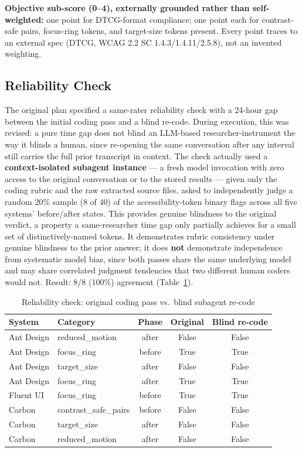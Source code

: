 \documentclass[11pt]{article}
\begin{document}
\textbf{Objective sub-score (0--4), externally grounded rather than self-weighted:} one point for DTCG-format compliance; one point each for contrast-safe pairs, focus-ring tokens, and target-size tokens present. Every point traces to an external spec (DTCG, WCAG 2.2 SC 1.4.3/1.4.11/2.5.8), not an invented weighting.

\subsection{Reliability Check}

The original plan specified a same-rater reliability check with a 24-hour gap between the initial coding pass and a blind re-code. During execution, this was revised: a pure time gap does not blind an LLM-based researcher-instrument the way it blinds a human, since re-opening the same conversation after any interval still carries the full prior transcript in context. The check actually used a \textbf{context-isolated subagent instance} --- a fresh model invocation with zero access to the original conversation or to the stored results --- given only the coding rubric and the raw extracted source files, asked to independently judge a random 20\% sample (8 of 40) of the accessibility-token binary flags across all five systems' before/after states. This provides genuine blindness to the original verdict, a property a same-researcher time gap only partially achieves for a small set of distinctively-named tokens. It demonstrates rubric consistency under genuine blindness to the prior answer; it does \textbf{not} demonstrate independence from systematic model bias, since both passes share the same underlying model and may share correlated judgment tendencies that two different human coders would not. Result: 8/8 (100\%) agreement (Table~\ref{tab:reliability}).

\begin{table}[h]
\centering
\small
\caption{Reliability check: original coding pass vs.\ blind subagent re-code}
\label{tab:reliability}
\begin{tabular}{llccc}
\toprule
\textbf{System} & \textbf{Category} & \textbf{Phase} & \textbf{Original} & \textbf{Blind re-code} \\
\midrule
Ant Design & reduced\_motion & after & False & False \\
Ant Design & focus\_ring & before & True & True \\
Ant Design & target\_size & after & False & False \\
Ant Design & focus\_ring & after & True & True \\
Fluent UI & focus\_ring & before & True & True \\
Carbon & contrast\_safe\_pairs & before & False & False \\
Carbon & target\_size & after & False & False \\
Carbon & reduced\_motion & after & False & False \\
\bottomrule
\end{tabular}
\end{table}
\end{document}
